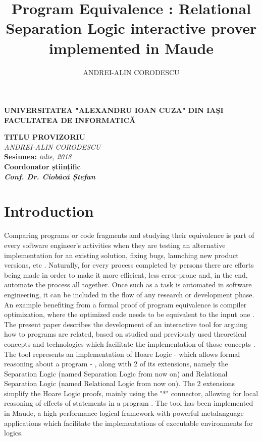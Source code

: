\documentclass[12pt,a4paper]{article}
\author{ANDREI-ALIN CORODESCU}
\title{Program Equivalence : Relational Separation Logic interactive prover implemented in Maude}
\begin{document}
\begin{titlepage}
\begin{center}
\textbf{
UNIVERSITATEA "ALEXANDRU IOAN CUZA" DIN IAȘI
}
\\
\textbf{FACULTATEA DE INFORMATICĂ}
\end{center}
   \vspace{50mm}
\begin{center}
	\Large\textbf {TITLU PROVIZORIU}\\
	\vspace{30mm}
	\large\textit {ANDREI-ALIN CORODESCU}
	\\
	\vspace{20mm}
	\textbf{Sesiunea: }\textit{iulie, 2018}\\
	\vspace{30mm}
	\textbf{Coordonator științific}\\
	\textbf{\textit{Conf. Dr. Ciobâcă Ștefan}}
	\vspace{30mm}
\end{center}
\end{titlepage}
\tableofcontents
\pagebreak

\section{Introduction}
Comparing programs or code fragments and studying their equivalence is part of every software engineer's activities when they are testing an alternative implementation for an existing solution, fixing bugs, launching new product versions, etc . Naturally, for every process completed by persons there are efforts being made in order to make it more efficient, less error-prone and, in the end, automate the process all together. Once such as a task is automated in software engineering, it can be included in the flow of any research or development phase. An example benefiting from a formal proof of program equivalence is compiler optimization, where the optimized code needs to be equivalent to the input one . \\

The present paper describes the development of an interactive tool for arguing how to programs are related, based on studied and previously used theoretical concepts and technologies which facilitate the implementation of those concepts . \\

The tool represents an implementation of Hoare Logic - which allows formal reasoning about a program - , along  with 2 of its extensions, namely the Separation Logic (named Separation Logic from now on) and Relational Separation Logic (named Relational Logic from now on). The 2 extensions simplify the Hoare Logic proofs, mainly using the "*" connector, allowing for local reasoning of effects of statements in a program . The tool has been implemented in Maude, a high performance logical framework with powerful metalanguage applications which facilitate the implementations of executable environments for logics.\\
\end{document}
